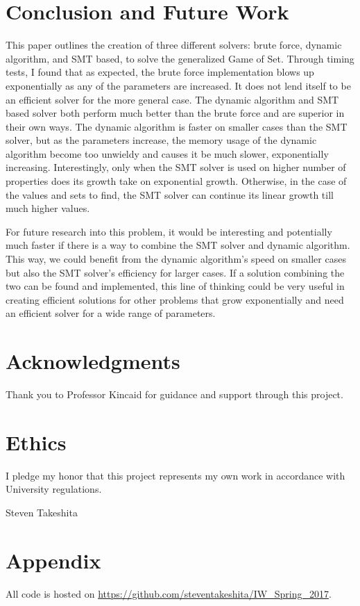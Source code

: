 \documentclass[pageno]{jpaper}
\begin{document}
\section{Conclusion and Future Work}


This paper outlines the creation of three different solvers: brute force, dynamic algorithm, and SMT based, to solve the generalized Game of Set. Through timing tests, I found that as expected, the brute force implementation blows up exponentially as any of the parameters are increased. It does not lend itself to be an efficient solver for the more general case. The dynamic algorithm and SMT based solver both perform much better than the brute force and are superior in their own ways. The dynamic algorithm is faster on smaller cases than the SMT solver, but as the parameters increase, the memory usage of the dynamic algorithm become too unwieldy and causes it be much slower, exponentially increasing. Interestingly, only when the SMT solver is used on higher number of properties does its growth take on exponential growth. Otherwise, in the case of the values and sets to find, the SMT solver can continue its linear growth till much higher values. 

For future research into this problem, it would be interesting and potentially much faster if there is a way to combine the SMT solver and dynamic algorithm. This way, we could benefit from the dynamic algorithm's speed on smaller cases but also the SMT solver's efficiency for larger cases. If a solution combining the two can be found and implemented, this line of thinking could be very useful in creating efficient solutions for other problems that grow exponentially and need an efficient solver for a wide range of parameters. 


\section{Acknowledgments}

Thank you to Professor Kincaid for guidance and support through this project. 

\section{Ethics}

I pledge my honor that this project represents my own work in accordance with University regulations.

Steven Takeshita






\section{Appendix}

All code is hosted on \url{https://github.com/steventakeshita/IW_Spring_2017}.
\end{document}
